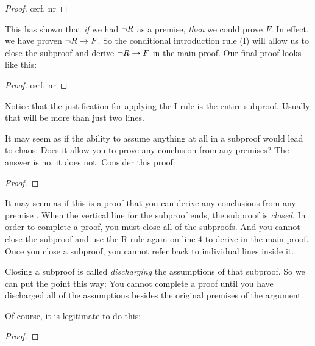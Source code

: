 \begin{proof}
	\open
		\oe{rf, nr}
	\close
\end{proof}

This has shown that \emph{if} we had $\neg R$ as a premise, \emph{then} we could prove $F$. In effect, we have proven $\neg R \rightarrow F$. So the conditional introduction rule ({\eif}I) will allow us to close the subproof and derive $\neg R \rightarrow F$ in the main proof. Our final proof looks like this:

\begin{proof}
	\open
		\oe{rf, nr}
	\close
\end{proof}


Notice that the justification for applying the {\eif}I rule is the entire subproof. Usually that will be more than just two lines.

It may seem as if the ability to assume anything at all in a subproof would lead to chaos: Does it allow you to prove any conclusion from any premises? The answer is no, it does not. Consider this proof:

\begin{proof}
	\open
		 
	\close
\end{proof}

It may seem as if this is a proof that you can derive any conclusions  from any premise . When the vertical line for the subproof ends, the subproof is \emph{closed}. In order to complete a proof, you must close all of the subproofs. And you cannot close the subproof and use the R rule again on line 4 to derive  in the main proof. Once you close a subproof, you cannot refer back to individual lines inside it.

Closing a subproof is called \emph{discharging} the assumptions of that subproof. So we can put the point this way: You cannot complete a proof until you have discharged all of the assumptions besides the original premises of the argument.

Of course, it is legitimate to do this:

\begin{proof}
	\open
		 
	\close
	 
\end{proof}

